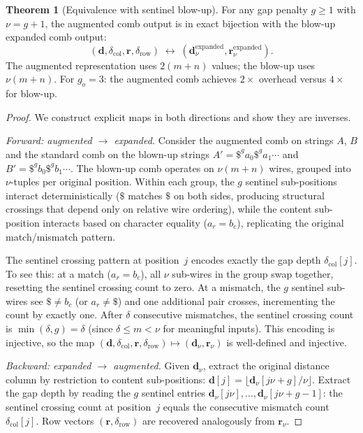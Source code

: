 \documentclass[11pt, a4paper]{article}
\theoremstyle{definition}
\newtheorem{theorem}{Theorem}
\theoremstyle{remark}
\newcommand{\dcol}{\mathbf{d}}
\newcommand{\drow}{\mathbf{r}}
\begin{document}
\begin{theorem}[Equivalence with sentinel blow-up]
\label{thm:bijection}
For any gap penalty $g \geq 1$ with $\nu = g + 1$, the augmented
comb output is in exact bijection with the blow-up expanded comb
output:
\[
  (\dcol, \delta_{\mathrm{col}}, \drow, \delta_{\mathrm{row}})
    \;\longleftrightarrow\;
  (\dcol_\nu^{\mathrm{expanded}}, \drow_\nu^{\mathrm{expanded}}).
\]
The augmented representation uses $2(m{+}n)$ values; the blow-up
uses $\nu(m{+}n)$.
For $g_o = 3$: the augmented comb achieves
$2{\times}$ overhead versus $4{\times}$ for blow-up.
\end{theorem}

\begin{proof}
We construct explicit maps in both directions and show they are
inverses.

\emph{Forward: augmented $\to$ expanded.}\enspace
Consider the augmented comb on strings $A$, $B$ and the standard
comb on the blown-up strings $A' = \$^g a_0 \$^g a_1 \cdots$
and $B' = \$^g b_0 \$^g b_1 \cdots$.
The blown-up comb
operates on $\nu(m{+}n)$ wires, grouped into $\nu$-tuples per
original position.
Within each group, the $g$ sentinel
sub-positions interact deterministically ($\$$ matches $\$$ on
both sides, producing structural crossings that depend only on
relative wire ordering), while the content sub-position interacts
based on character equality ($a_r = b_c$), replicating the
original match/mismatch pattern.

The sentinel crossing pattern at position~$j$ encodes exactly the
gap depth $\delta_{\mathrm{col}}[j]$.
To see this: at a match
($a_r = b_c$), all $\nu$ sub-wires in the group swap together,
resetting the sentinel crossing count to zero.
At a mismatch,
the $g$ sentinel sub-wires see $\$ \ne b_c$ (or $a_r \ne \$$)
and one additional pair crosses, incrementing the count by
exactly one.
After $\delta$ consecutive mismatches, the sentinel
crossing count is $\min(\delta, g) = \delta$ (since
$\delta \leq m < \nu$ for meaningful inputs).
This encoding is injective, so the
map $(\dcol, \delta_{\mathrm{col}}, \drow,
\delta_{\mathrm{row}}) \mapsto (\dcol_\nu, \drow_\nu)$ is
well-defined and injective.

\emph{Backward: expanded $\to$ augmented.}\enspace
Given $\dcol_\nu$, extract the original distance column by
restriction to content sub-positions:
$\dcol[j] = \lfloor \dcol_\nu[j\nu + g] / \nu \rfloor$.
Extract the gap depth by reading the $g$ sentinel entries
$\dcol_\nu[j\nu], \dots, \dcol_\nu[j\nu+g-1]$: the sentinel
crossing count at position~$j$ equals the consecutive mismatch
count $\delta_{\mathrm{col}}[j]$.
Row vectors
$(\drow, \delta_{\mathrm{row}})$ are recovered analogously from
$\drow_\nu$.


\end{proof}
\end{document}
